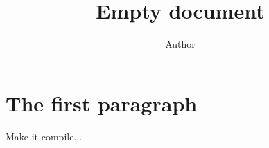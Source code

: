 \documentclass[11pt]{article}
\title{Empty document}
\author{Author}
\begin{document}
\maketitle

\section{The first paragraph}
Make it compile...
\end{document}
